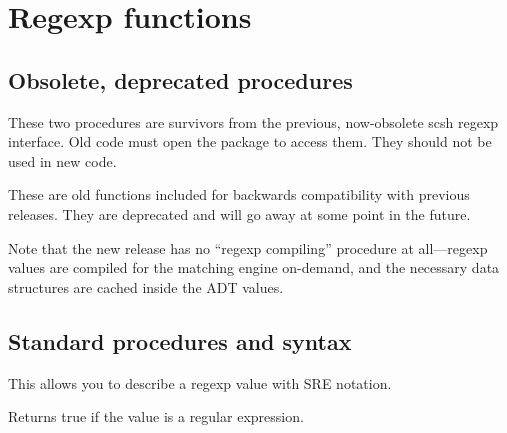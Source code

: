 \section{Regexp functions}

\subsection{Obsolete, deprecated procedures}

These two procedures are survivors from the previous, now-obsolete scsh regexp
interface. Old code must open the  package to access them. They
should not be used in new code.


\begin{desc}
    These are old functions included for backwards compatibility with
    previous releases. They are deprecated and will go away at some point in
    the future.

    Note that the new release has no ``regexp compiling'' procedure at
    all---regexp values are compiled for the matching engine on-demand,
    and the necessary data structures are cached inside the ADT values.
\end{desc}

\subsection{Standard procedures and syntax}

\begin{desc}
    This allows you to describe a regexp value with SRE notation.
\end{desc}

\begin{desc}
    Returns true if the value is a regular expression.
\end{desc}

